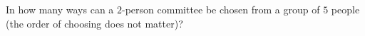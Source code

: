 In how many ways can a $2$-person committee be chosen from a group of $5$ people (the order of choosing does not matter)?
